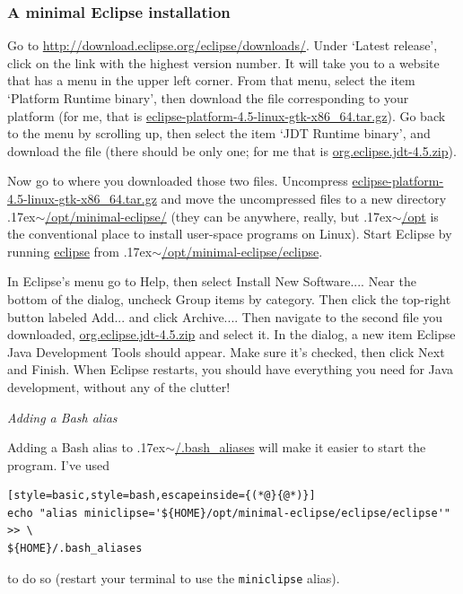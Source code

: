 \documentclass[12pt, a4paper, twoside,openany,titlepage]{article}
\newcommand{\mytilde}{\raise.17ex\hbox{$\scriptstyle\sim$}}
\begin{document}
{\subsubsection{A minimal Eclipse installation}

Go to \url{http://download.eclipse.org/eclipse/downloads/}. Under `Latest release', click on the link with the highest version number. It will take you to a website that has a menu in the upper left corner. From that menu, select the item `Platform Runtime binary', then download the file corresponding to your platform (for me, that is \url{eclipse-platform-4.5-linux-gtk-x86_64.tar.gz}). Go back to the menu by scrolling up, then select the item `JDT Runtime binary', and download the file (there should be only one; for me that is \url{org.eclipse.jdt-4.5.zip}).

Now go to where you downloaded those two files. Uncompress \url{eclipse-platform-4.5-linux-gtk-x86_64.tar.gz} and move the uncompressed files to a new directory \mytilde\url{/opt/minimal-eclipse/} (they can be anywhere, really, but \mytilde\url{/opt} is the conventional place to install user-space programs on Linux). Start Eclipse by running \url{eclipse} from \mytilde\url{/opt/minimal-eclipse/eclipse}.

In Eclipse's menu go to \textsf{Help}, then select \textsf{Install New Software...}. Near the bottom of the dialog, uncheck \textsf{Group items by category}. Then click the top-right button labeled \textsf{Add...} and click \textsf{Archive...}. Then navigate to the second file you downloaded, \url{org.eclipse.jdt-4.5.zip} and select it. In the dialog, a new item \textsf{Eclipse Java Development Tools} should appear. Make sure it's checked, then click \textsf{Next} and \textsf{Finish}. When Eclipse restarts, you should have everything you need for Java development, without any of the clutter!

\needspace{4em}
\vspace{2em}
\textit{Adding a Bash alias}

Adding a Bash alias to \mytilde\url{/.bash_aliases} will make it easier to start the program. I've used
\begin{lstlisting}[style=basic,style=bash,escapeinside={(*@}{@*)}]
echo "alias miniclipse='${HOME}/opt/minimal-eclipse/eclipse/eclipse'" >> \
${HOME}/.bash_aliases
\end{lstlisting}
to do so (restart your terminal to use the \texttt{miniclipse} alias).

}
\end{document}
